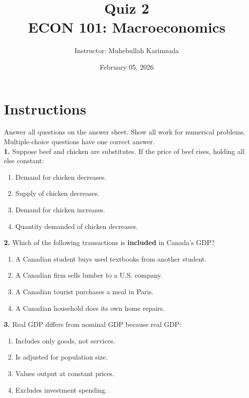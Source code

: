 \documentclass[11pt]{article}
\title{\textbf{Quiz 2} \vspace{ 0.4cm }\\ECON 101: Macroeconomics }
\author{Instructor: Muhebullah Karimzada}
\date{February 05,  2026}
\begin{document}
\maketitle



\section*{Instructions}
Answer all questions on the answer sheet.  Show all work for numerical problems. Multiple-choice questions have one correct answer.\\



\textbf{1.} Suppose beef and chicken are substitutes. If the price of beef rises, holding all else constant:  
\begin{enumerate}[label=\alph*)]
    \item Demand for chicken decreases.  
    \item Supply of chicken decreases.  
    \item Demand for chicken increases.  
    \item Quantity demanded of chicken decreases.  
\end{enumerate}

\bigskip

\textbf{2.} Which of the following transactions is \textbf{included} in Canada’s GDP?  
\begin{enumerate}[label=\alph*)]
    \item A Canadian student buys used textbooks from another student.  
    \item A Canadian firm sells lumber to a U.S. company.  
    \item A Canadian tourist purchases a meal in Paris.  
    \item A Canadian household does its own home repairs.  
\end{enumerate}

\bigskip

\textbf{3.} Real GDP differs from nominal GDP because real GDP:  
\begin{enumerate}[label=\alph*)]
    \item Includes only goods, not services.  
    \item Is adjusted for population size.  
    \item Values output at constant prices.  
    \item Excludes investment spending.  
\end{enumerate}
\end{document}
